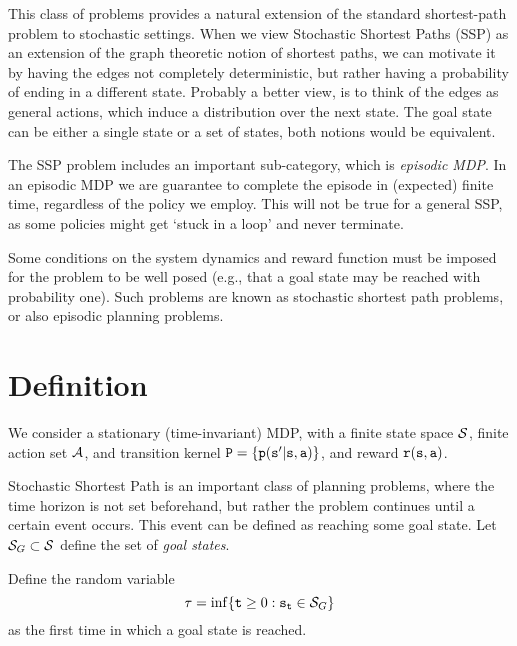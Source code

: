 




This class of problems provides a natural extension of the standard shortest-path problem to stochastic settings. When we view Stochastic Shortest Paths (SSP) as an extension of the graph theoretic notion of shortest paths, we can motivate it by having the edges not completely deterministic, but rather having a probability of ending in a different state.
%
Probably a better view, is to think of the edges as general actions, which induce a distribution over the next state.
%
The goal state can be either a single state or a set of states, both notions would be equivalent. 

The SSP problem includes an important sub-category, which is {\em episodic MDP}. In an episodic MDP we are guarantee to complete the episode in (expected) finite time, regardless of the policy we employ. This will not be true for a general SSP, as some policies might get `stuck in a loop' and never terminate. 


Some conditions on the system dynamics and reward function must be imposed for the problem to be well posed (e.g., that a goal state may be reached  with probability one).
Such problems are known as stochastic shortest path problems, or also episodic planning problems. 

\section{Definition}

We consider a stationary (time-invariant) MDP, with a finite state
space $\mathcal{S}$, finite action set $\mathcal{A}$, and transition kernel
${\tt P} = \{{\tt p}({\tt s}'|{\tt s},{\tt a})\}$, and reward ${\tt r}({\tt s},{\tt a})$.

Stochastic Shortest Path is an important class of planning problems, 
where the time horizon is not
set beforehand, but rather the problem continues until a certain
event occurs. This event can be defined as reaching some goal state.
Let  ${\mathcal{S}_G} \subset \mathcal{S}$ define the set of \emph{goal
states}. 

\begin{definition}
Define the random variable
\[\tau  = \inf \{ {\tt t} \ge 0:{{\tt s}_{\tt t}} \in {\mathcal{S}_G}\} \]
as the first time in which a goal state is reached.     
\end{definition}

